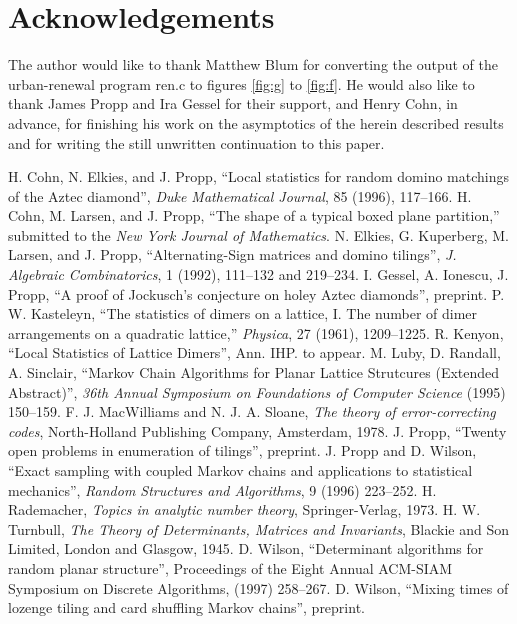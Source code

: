 \documentclass[10pt,reqno]{amsart}
\theoremstyle{plain}
\theoremstyle{definition}
\theoremstyle{remark}
\newcommand{\ntt}{\normalfont\ttfamily}
\newcommand{\pkg}[1]{{\protect\ntt#1}}
\begin{document}
\section{Acknowledgements}
The author would like to thank Matthew Blum for converting the output
of the urban-renewal program \pkg{ren.c} to figures \ref{fig:g} to
\ref{fig:f}. He would also like to thank James Propp and
Ira Gessel  for their support, 
and Henry Cohn, in advance, for finishing his work on the asymptotics of the
herein described results and for writing the still unwritten continuation
to this paper.

\begin{thebibliography}{99}
 H. Cohn, N. Elkies, and J. Propp, ``Local statistics for random domino
matchings of the Aztec diamond'', {\em Duke Mathematical Journal},
85 (1996), 117--166.
 H. Cohn, M. Larsen, and J. Propp, ``The shape
of a typical boxed plane partition,'' submitted to the {\em New York
Journal of Mathematics}.
 N. Elkies, G. Kuperberg, M. Larsen, and J. Propp, ``Alternating-Sign
matrices and domino tilings'',  {\em J. Algebraic Combinatorics},
1 (1992),  111--132 and 219--234.
 I. Gessel, A. Ionescu, J. Propp, ``A proof of Jockusch's conjecture
on holey Aztec diamonds'', preprint.
P. W. Kasteleyn, ``The statistics of dimers on a lattice,
I. The number of dimer arrangements on a quadratic lattice,''
{\em Physica}, 27 (1961), 1209--1225. 
R. Kenyon, ``Local Statistics of Lattice Dimers'', 
Ann. IHP. to appear.
M. Luby, D. Randall, A. Sinclair, ``Markov Chain Algorithms for Planar
Lattice Strutcures (Extended Abstract)'', {\em 36th Annual Symposium on
Foundations of Computer Science} (1995) 150--159.
F. J. MacWilliams and N. J. A. Sloane, {\em The theory of error-correcting
codes}, North-Holland Publishing Company, Amsterdam, 1978.
J. Propp, ``Twenty open problems in enumeration of tilings'', preprint.
J. Propp and D. Wilson, ``Exact sampling with coupled {M}arkov chains and 
applications to statistical mechanics'', {\em Random Structures and
Algorithms}, 9 (1996) 223--252.
H. Rademacher, {\em Topics in analytic number theory}, Springer-Verlag, 1973. 
H. W. Turnbull, {\em The Theory of Determinants, Matrices and Invariants},
Blackie and Son Limited, London and Glasgow, 1945.
D. Wilson, ``Determinant algorithms for random planar structure'',
{Proceedings of the Eight Annual ACM-SIAM Symposium on Discrete Algorithms},
(1997) 258--267.
D. Wilson, ``Mixing times of lozenge tiling and card shuffling {M}arkov 
chains'', preprint.
\end{thebibliography}
\end{document}
